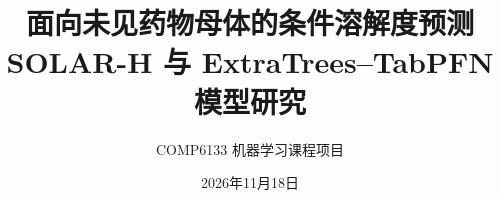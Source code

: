 \documentclass{assignment}
\title{面向未见药物母体的条件溶解度预测\\SOLAR-H 与 ExtraTrees--TabPFN 模型研究}
\author{COMP6133 机器学习课程项目}
\date{2026年11月18日}
\begin{document}
\maketitle
\setcounter{tocdepth}{2}
\tableofcontents
\clearpage













\FloatBarrier
\newcommand{\BIBdecl}{\fontsize{10}{13}\selectfont\setlength{\itemsep}{0.1em}\setlength{\parsep}{0pt}}


\end{document}

